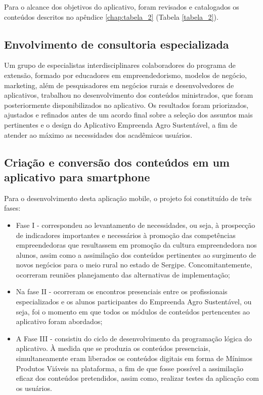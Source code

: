 Para o alcance dos objetivos do aplicativo, foram revisados e catalogados os conteúdos descritos no apêndice \ref{chap:tabela_2} (Tabela \ref{tabela_2}). 



\subsection{Envolvimento de consultoria especializada}

Um grupo de especialistas interdisciplinares colaboradores do programa de extensão, formado por educadores em empreendedorismo, modelos de negócio, marketing, além de pesquisadores em negócios rurais e desenvolvedores de aplicativos, trabalhou no desenvolvimento dos conteúdos ministrados, que foram posteriormente disponibilizados no aplicativo. Os resultados foram priorizados, ajustados e refinados antes de um acordo final sobre a seleção dos assuntos mais pertinentes e o design do Aplicativo Empreenda Agro Sustentável, a fim de atender ao máximo as necessidades dos acadêmicos usuários.



\subsection{Criação e conversão dos conteúdos em um aplicativo para smartphone}

Para o desenvolvimento desta aplicação mobile, o projeto foi constituído de três fases: 

\begin{itemize}
\item{Fase I - correspondeu ao levantamento de necessidades, ou seja, à prospecção de indicadores importantes e necessários à promoção das competências empreendedoras que resultassem em promoção da cultura empreendedora nos alunos, assim como a assimilação dos conteúdos pertinentes ao surgimento de novos negócios para o meio rural no estado de Sergipe. Concomitantemente, ocorreram reuniões planejamento das alternativas de implementação;}
\item{Na fase II - ocorreram os encontros presenciais entre os profissionais especializados e os alunos participantes do Empreenda Agro Sustentável, ou seja, foi o momento em que todos os módulos de conteúdos pertencentes ao aplicativo foram abordados;}
\item{A Fase III - consistiu do ciclo de desenvolvimento da programação lógica do aplicativo. À medida que se produzia os conteúdos presenciais, simultaneamente eram liberados os conteúdos digitais em forma de Mínimos Produtos Viáveis na plataforma, a fim de que fosse possível a assimilação eficaz dos conteúdos pretendidos, assim como, realizar testes da aplicação com os usuários.}
    
\end{itemize}

